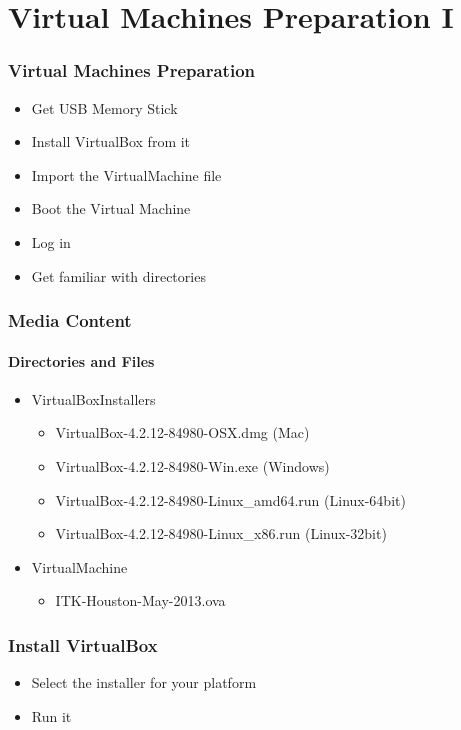 \section{Virtual Machines Preparation I}


\begin{frame}
\frametitle{Virtual Machines Preparation}
\begin{itemize}
\item Get USB Memory Stick
\item Install VirtualBox from it
\item Import the VirtualMachine file
\item Boot the Virtual Machine
\item Log in
\item Get familiar with directories
\end{itemize}
\end{frame}


\begin{frame}
\frametitle{Media Content}
\framesubtitle{Directories and Files}
\begin{itemize}
\item VirtualBoxInstallers
\begin{itemize}
\item VirtualBox-4.2.12-84980-OSX.dmg (Mac)
\item VirtualBox-4.2.12-84980-Win.exe (Windows)
\item VirtualBox-4.2.12-84980-Linux\_amd64.run (Linux-64bit)
\item VirtualBox-4.2.12-84980-Linux\_x86.run (Linux-32bit)
\end{itemize}
\pause
\item VirtualMachine
\begin{itemize}
\item  ITK-Houston-May-2013.ova
\end{itemize}
\end{itemize}
\end{frame}

\begin{frame}
\frametitle{Install VirtualBox}
\begin{itemize}
\item Select the installer for your platform
\item Run it
\end{itemize}
\end{frame}

